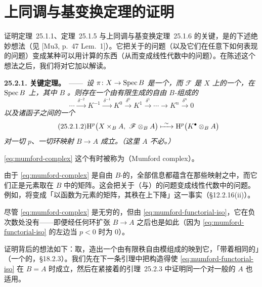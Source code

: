
\section{上同调与基变换定理的证明}

证明\mbox{\trSemicontinuity{}定理~25.1.1}、\mbox{\trGrauert{}定理~25.1.5} 与\mbox{上同调与基变换定理~25.1.6} 的关键，是\trMumford{}的下述绝妙想法（见 [Mu3, p.~47 Lem.~1]）。它把关于\trHigherPushforward{}的问题（以及它们在任意\trBaseChange{}下如何表现的问题）变成某种可以用\trVectorBundle{}计算的东西（从而变成线性代数中的问题）。在陈述这个想法之后，我们将对它加以解读。

\textbf{25.2.1. 关键定理。}\ ——\ \emph{设 $\pi\colon X\to\operatorname{Spec} B$ 是一个\trProper{}\trMorphism，而 $\mathscr{F}$ 是 $X$ 上的一个\trCoherentSheaf，在 $\operatorname{Spec} B$ 上\trFlat，其中 $B$ \trNoether。则存在一个由有限生成的自由 $B$-\trModule{}组成的\trComplexN}
\begin{equation*}
\tag{25.2.1.1}\label{eq:mumford-complex}
\cdots\xrightarrow{\ \delta^{-2}\ }K^{-1}\xrightarrow{\ \delta^{-1}\ }K^{0}\xrightarrow{\ \delta^{0}\ }K^{1}\xrightarrow{\ \delta^{1}\ }\cdots\longrightarrow K^{n}\xrightarrow{\ \delta^{n}\ }0
\end{equation*}
\emph{以及诸函子之间的一个\trIsomorphism}
\begin{equation*}
\tag{25.2.1.2}\label{eq:mumford-functorial-iso}
\mathrm{H}^p\bigl(X\times_B A,\ \mathscr{F}\otimes_B A\bigr)\xmapsto{\ \sim\ }\mathrm{H}^p\bigl(K^{\bullet}\otimes_B A\bigr)
\end{equation*}
\emph{对一切 $p$、一切环映射 $B\to A$ 成立。（这里 $A$ 不必\trNoether。）}

\eqref{eq:mumford-complex} 这个\trComplexN{}有时被称为\textbf{\trMumford\trComplexN}（Mumford complex）。

由于 \eqref{eq:mumford-complex} 是自由 $B$-\trModule{}的\trComplexN，全部信息都蕴含在那些映射之中，而它们正是元素取在 $B$ 中的矩阵。这会把关于\trCohomology{}（与\trBaseChange）的问题变成线性代数中的问题。例如，\trSemicontinuity{}将变成「以函数为元素的矩阵，其秩在\trClosedSubset{}上下降」这一事实（\S12.2.16(ii)）。

尽管 \eqref{eq:mumford-complex} 是无穷的，但由 \eqref{eq:mumford-functorial-iso}，它在负次数处没有\trCohomology——即便经任何环扩张 $B\to A$ 之后也是如此（因为 \eqref{eq:mumford-functorial-iso} 的左边当 $p<0$ 时为 $0$）。

证明背后的想法如下：取\trCech\trComplexN，造出一个由有限秩自由模组成的\trComplexN{}映到它，「带着相同的\trCohomology」（一个\trQuasiisomorphism{}的\trComplexN，\S18.2.3）。我们先在下一条引理中把\trComplexN{}构造得使 \eqref{eq:mumford-functorial-iso} 在 $B=A$ 时成立，然后在紧接着的\mbox{引理~25.2.3} 中证明同一个\trComplexN{}对一般的 $A$ 也适用。

